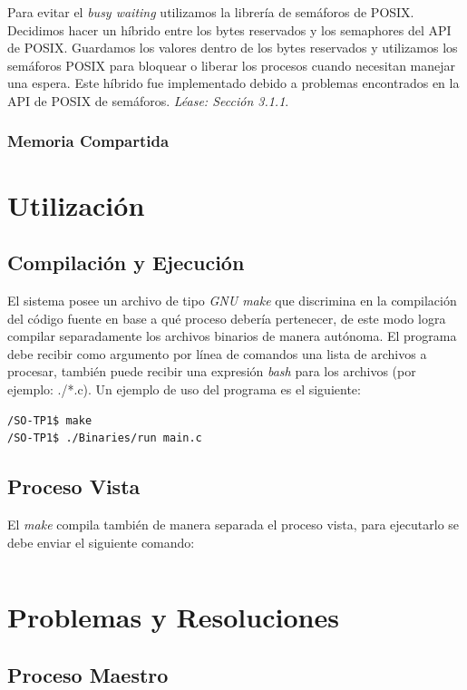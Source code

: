 \documentclass[10pt,a4paper]{report}
\begin{document}
Para evitar el \textit{busy waiting} utilizamos la librería de semáforos de POSIX. Decidimos hacer un híbrido entre los bytes reservados y los semaphores del API de POSIX. Guardamos los valores dentro de los bytes reservados y utilizamos los semáforos POSIX para bloquear o liberar los procesos cuando necesitan manejar una espera. Este híbrido fue implementado debido a problemas encontrados en la API de POSIX de semáforos. \textit{Léase: Sección 3.1.1}.
\subsection{Memoria Compartida}

\chapter{Utilización}
\section{Compilación y Ejecución}
El sistema posee un archivo de tipo \textit{GNU make} que discrimina en la compilación del código fuente en base a qué proceso debería pertenecer, de este modo logra compilar separadamente los archivos binarios de manera autónoma. El programa debe recibir como argumento por línea de comandos una lista de archivos a procesar, también puede recibir una expresión \textit{bash} para los archivos (por ejemplo: ./*.c). Un ejemplo de uso del programa es el siguiente:
\begin{lstlisting}
/SO-TP1$ make
/SO-TP1$ ./Binaries/run main.c
\end{lstlisting}


\section{Proceso Vista}
El \textit{make} compila también de manera separada el proceso vista, para ejecutarlo se debe enviar el siguiente comando:
\begin{lstlisting}
\end{lstlisting}


\chapter{Problemas y Resoluciones}
\section{Proceso Maestro}
\end{document}
